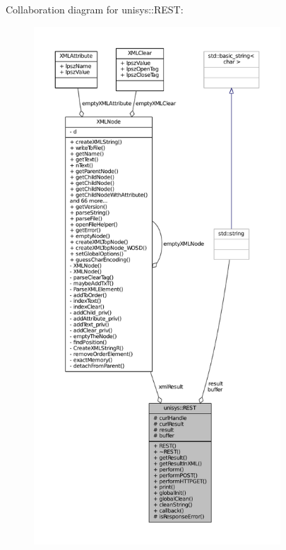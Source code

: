 Collaboration diagram for unisys\-:\-:R\-E\-S\-T\-:
\nopagebreak
\begin{figure}[H]
\begin{center}
\leavevmode
\includegraphics[height=550pt]{classunisys_1_1REST__coll__graph}
\end{center}
\end{figure}

